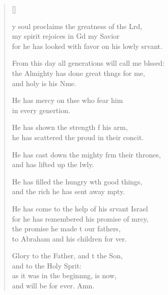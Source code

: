 \settowidth{\versewidth}{From this day all generations will call me blessed: +}
\begin{verse}[\versewidth]
  \begin{patverse}
y soul proclaims the greatness of the Lrd,\Flex\\
my spirit rejoices in Gd my Savior\Med\\
for he has looked with favor on his lowly srvant.

From this day all generations will call me blssed:\Flex\\
the Almighty has done great th\pointup{\i}ngs for me,\Med\\
and holy is his Nme.

He has mercy on thse who fear him\Med\\
in every genertion.

He has shown the strength f his arm,\Med\\
he has scattered the proud in their concit.

He has cast down the mighty frm their thrones,\Med\\
and has lifted up the lwly.

He has filled the hungry w\pointup{\i}th good things,\Med\\
and the rich he has sent away mpty.

He has come to the help of his srvant Israel\Med\\
for he has remembered his promise of mrcy,\\
the promise he made t our fathers,\Med\\
to Abraham and his children for ver.

Glory to the Father, and t the Son,\Med\\
and to the Holy Sp\pointup{\i}rit:\\
as it was in the beginn\pointup{\i}ng, is now,\Med\\
and will be for ever. Amn.
  \end{patverse}
\end{verse}
